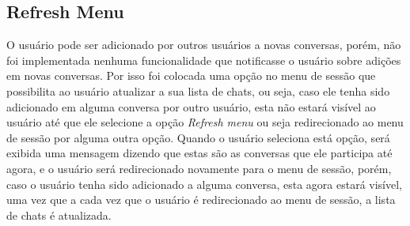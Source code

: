 \documentclass[../main.tex]{subfiles}
\begin{document}
\subsection{Refresh Menu}

O usuário pode ser adicionado por outros usuários a novas conversas, porém, não foi implementada nenhuma funcionalidade que notificasse o usuário sobre adições em novas conversas. Por isso foi colocada uma opção no menu de sessão que possibilita ao usuário atualizar a sua lista de chats, ou seja, caso ele tenha sido adicionado em alguma conversa por outro usuário, esta não estará visível ao usuário até que ele selecione a opção \textit{Refresh menu} ou seja redirecionado ao menu de sessão por alguma outra opção. Quando o usuário seleciona está opção, será exibida uma mensagem dizendo que estas são as conversas que ele participa até agora, e o usuário será redirecionado novamente para o menu de sessão, porém, caso o usuário tenha sido adicionado a alguma conversa, esta agora estará visível, uma vez que a cada vez que o usuário é redirecionado ao menu de sessão, a lista de chats é atualizada.
\end{document}
